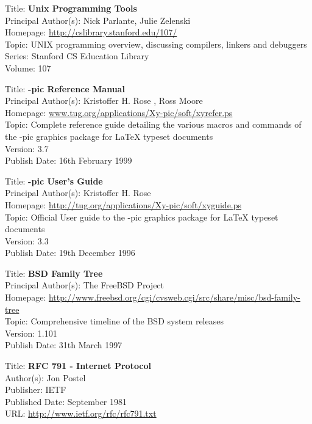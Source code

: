 
Title: 	\textbf{Unix Programming Tools}	\\
Principal Author(s): 	Nick Parlante, Julie Zelenski \\
Homepage: 	\url{http://cslibrary.stanford.edu/107/}	\\	
Topic:		UNIX programming overview, discussing compilers, linkers and debuggers \\
Series:		Stanford CS Education Library	\\
Volume:		107 


Title: 	\textbf{\textrm{\Xy-pic} Reference Manual}	\\
Principal Author(s): 	Kristoffer H. Rose , Ross Moore \\
Homepage:	\url{www.tug.org/applications/Xy-pic/soft/xyrefer.ps} 	\\	
Topic:		Complete reference guide detailing the various macros and commands of the \textrm{\Xy-pic} graphics package for \textrm{\LaTeX{}} typeset documents \\
Version:		3.7 \\
Publish Date:		16th February 1999


Title: 	\textbf{\textrm{\Xy-pic} User's Guide}	\\
Principal Author(s): 	Kristoffer H. Rose  \\
Homepage:	\url{http://tug.org/applications/Xy-pic/soft/xyguide.ps} 	\\	
Topic:		Official User guide to the \textrm{\Xy-pic} graphics package for \textrm{\LaTeX{}} typeset documents \\
Version:		3.3 \\
Publish Date:		19th December 1996


Title: 	\textbf{BSD Family Tree}	\\
Principal Author(s): 	The FreeBSD Project \\
Homepage:
\url{http://www.freebsd.org/cgi/cvsweb.cgi/src/share/misc/bsd-family-tree} 	\\	
Topic:		Comprehensive timeline of the BSD system releases\\
Version:		1.101 \\
Publish Date:		31th March 1997


Title: \textbf{RFC 791 - Internet Protocol} \\
Author(s): Jon Postel \\
Publisher: IETF \\ 
Published Date: September 1981 \\ 
URL: \url{http://www.ietf.org/rfc/rfc791.txt}    



